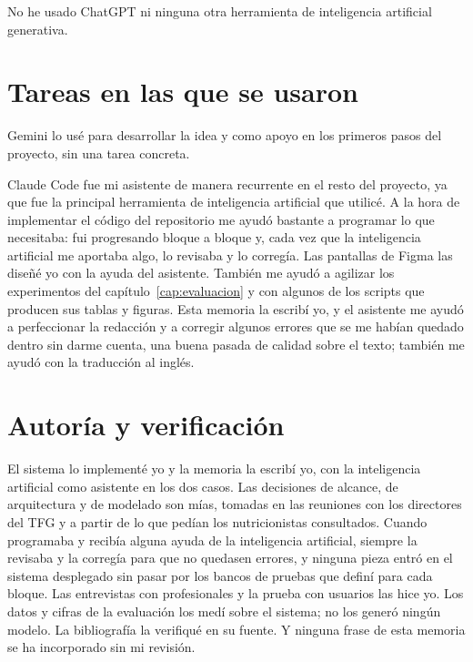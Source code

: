 No he usado ChatGPT ni ninguna otra herramienta de inteligencia artificial generativa.

\section*{Tareas en las que se usaron}

Gemini lo usé para desarrollar la idea y como apoyo en los primeros pasos del proyecto, sin una tarea concreta.

Claude Code fue mi asistente de manera recurrente en el resto del proyecto, ya que fue la principal herramienta de inteligencia artificial que utilicé. A la hora de implementar el código del repositorio me ayudó bastante a programar lo que necesitaba: fui progresando bloque a bloque y, cada vez que la inteligencia artificial me aportaba algo, lo revisaba y lo corregía. Las pantallas de Figma las diseñé yo con la ayuda del asistente. También me ayudó a agilizar los experimentos del capítulo~\ref{cap:evaluacion} y con algunos de los scripts que producen sus tablas y figuras. Esta memoria la escribí yo, y el asistente me ayudó a perfeccionar la redacción y a corregir algunos errores que se me habían quedado dentro sin darme cuenta, una buena pasada de calidad sobre el texto; también me ayudó con la traducción al inglés.

\section*{Autoría y verificación}

El sistema lo implementé yo y la memoria la escribí yo, con la inteligencia artificial como asistente en los dos casos. Las decisiones de alcance, de arquitectura y de modelado son mías, tomadas en las reuniones con los directores del TFG y a partir de lo que pedían los nutricionistas consultados. Cuando programaba y recibía alguna ayuda de la inteligencia artificial, siempre la revisaba y la corregía para que no quedasen errores, y ninguna pieza entró en el sistema desplegado sin pasar por los bancos de pruebas que definí para cada bloque. Las entrevistas con profesionales y la prueba con usuarios las hice yo. Los datos y cifras de la evaluación los medí sobre el sistema; no los generó ningún modelo. La bibliografía la verifiqué en su fuente. Y ninguna frase de esta memoria se ha incorporado sin mi revisión.
